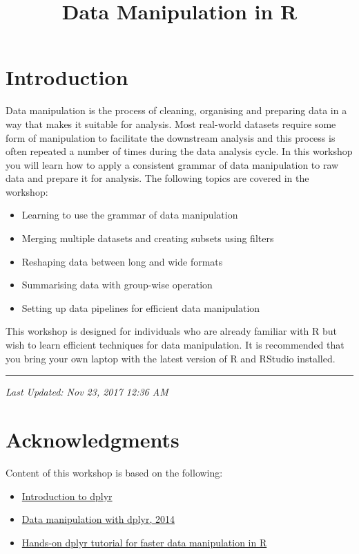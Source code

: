 \documentclass[]{article}
\title{Data Manipulation in R}
\author{}
\date{}
\providecommand{\tightlist}{%
  \setlength{\itemsep}{0pt}\setlength{\parskip}{0pt}}
\theoremstyle{definition}
\theoremstyle{definition}
\theoremstyle{definition}
\theoremstyle{remark}
\begin{document}
\maketitle

{
\setcounter{tocdepth}{2}
\tableofcontents
}
\section{Introduction}\label{introduction}

Data manipulation is the process of cleaning, organising and preparing
data in a way that makes it suitable for analysis. Most real-world
datasets require some form of manipulation to facilitate the downstream
analysis and this process is often repeated a number of times during the
data analysis cycle. In this workshop you will learn how to apply a
consistent grammar of data manipulation to raw data and prepare it for
analysis. The following topics are covered in the workshop:

\begin{itemize}
\tightlist
\item
  Learning to use the grammar of data manipulation
\item
  Merging multiple datasets and creating subsets using filters
\item
  Reshaping data between long and wide formats
\item
  Summarising data with group-wise operation
\item
  Setting up data pipelines for efficient data manipulation
\end{itemize}

This workshop is designed for individuals who are already familiar with
R but wish to learn efficient techniques for data manipulation. It is
recommended that you bring your own laptop with the latest version of R
and RStudio installed.

\begin{center}\rule{0.5\linewidth}{\linethickness}\end{center}

\emph{Last Updated: Nov 23, 2017 12:36 AM}

\section{Acknowledgments}\label{acknowledgments}

Content of this workshop is based on the following:

\begin{itemize}
\tightlist
\item
  \href{https://cran.rstudio.com/web/packages/dplyr/vignettes/introduction.html}{Introduction
  to dplyr}
\item
  \href{http://bit.ly/hadley_dplyr_tutorial_2014}{Data manipulation with
  dplyr, 2014}
\item
  \href{https://www.r-bloggers.com/hands-on-dplyr-tutorial-for-faster-data-manipulation-in-r}{Hands-on
  dplyr tutorial for faster data manipulation in R}
\end{itemize}
\end{document}

